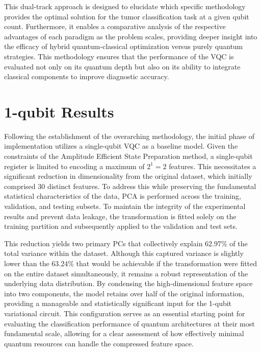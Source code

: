 \documentclass[en]{dimscthesis}
\begin{document}
This dual-track approach is designed to elucidate which specific methodology provides the optimal solution for the tumor classification task at a given qubit count. Furthermore, it enables a comparative analysis of the respective advantages of each paradigm as the problem scales, providing deeper insight into the efficacy of hybrid quantum-classical optimization versus purely quantum strategies. This methodology ensures that the performance of the VQC is evaluated not only on its quantum depth but also on its ability to integrate classical components to improve diagnostic accuracy.

\section{1-qubit Results} \label{1qbt}

Following the establishment of the overarching methodology, the initial phase of implementation utilizes a single-qubit VQC as a baseline model. Given the constraints of the Amplitude Efficient State Preparation method, a single-qubit register is limited to encoding a maximum of $2^1 = 2$ features. This necessitates a significant reduction in dimensionality from the original dataset, which initially comprised 30 distinct features. To address this while preserving the fundamental statistical characteristics of the data, PCA is performed across the training, validation, and testing subsets. To maintain the integrity of the experimental results and prevent data leakage, the transformation is fitted solely on the training partition and subsequently applied to the validation and test sets.

This reduction yields two primary PCs that collectively explain 62.97\% of the total variance within the dataset. Although this captured variance is slightly lower than the 63.24\% that would be achievable if the transformation were fitted on the entire dataset simultaneously, it remains a robust representation of the underlying data distribution. By condensing the high-dimensional feature space into two components, the model retains over half of the original information, providing a manageable and statistically significant input for the 1-qubit variational circuit. This configuration serves as an essential starting point for evaluating the classification performance of quantum architectures at their most fundamental scale, allowing for a clear assessment of how effectively minimal quantum resources can handle the compressed feature space.
\end{document}
